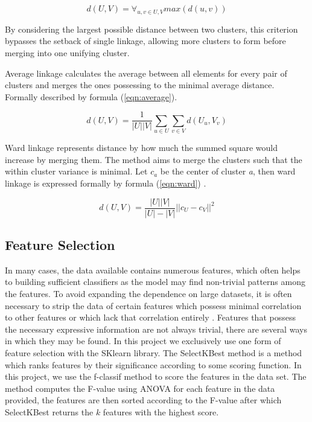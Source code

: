 \begin{equation}
\label{eqn:complete}
d(U, V) = \forall_{u, v \in U, V} max(d(u, v))
\end{equation}

By considering the largest possible distance between two clusters, this criterion bypasses the setback of single linkage, allowing more clusters to form before merging into one unifying cluster.

Average linkage calculates the average between all elements for every pair of clusters and merges the ones possessing to the minimal average distance. Formally described by formula (\ref{eqn:average}).

\begin{equation}
\label{eqn:average}
d(U, V) = \frac{1}{|U||V|}\sum\limits_{u\in U} \sum\limits_{v\in V}  d(U_u, V_v)
\end{equation}

Ward linkage represents distance by how much the summed square would increase by merging them. The method aims to merge the clusters such that the within cluster variance is minimal. Let $c_a$ be the center of cluster \textit{a}, then ward linkage is expressed formally by formula (\ref{eqn:ward}) \cite{shalizi2009distances}.


\begin{equation}
\label{eqn:ward}
d(U, V) = \frac{|U||V|}{|U|-|V|}||c_U - c_V||^2
\end{equation}



\subsection{Feature Selection}

In many cases, the data available contains numerous features, which often helps to building sufficient classifiers as the model may find non-trivial patterns among the features. To avoid expanding the dependence on large datasets, it is often necessary to strip the data of certain features which possess minimal correlation to other features or which lack that correlation entirely \cite{dash1997feature}. Features that possess the necessary expressive information are not always trivial, there are several ways in which they may be found. In this project we exclusively use one form of feature selection with the SKlearn library. The SelectKBest method is a method which ranks features by their significance according to some scoring function. In this project, we use the f-classif method to score the features in the data set. The method computes the F-value using ANOVA for each feature in the data provided, the features are then sorted according to the F-value after which SelectKBest returns the $k$ features with the highest score.


